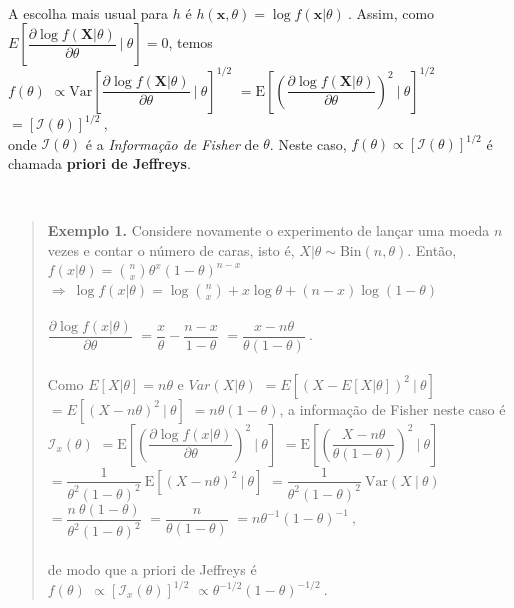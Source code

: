 \documentclass[
]{book}
\begin{document}
\(~\)

A escolha mais usual para \(h\) é \(h(\boldsymbol{x},\theta)=\log f(\boldsymbol{x}|\theta)~.\) Assim, como \(E\left[\dfrac{\partial \log f(\boldsymbol{X}|\theta)}{\partial\theta}~\bigg|~\theta\right]=0\), temos\\
\(f(\theta)\)
\(\propto\text{Var}\left[\dfrac{\partial \log f(\boldsymbol{X}|\theta)}{\partial\theta}~\bigg|~\theta\right]^{1/2}\)
\(=\text{E}\left[\left(\dfrac{\partial \log f(\boldsymbol{X}|\theta)}{\partial\theta}\right)^2~\bigg|~\theta\right]^{1/2}\)
\(=\left[\mathcal{I}(\theta)\right]^{1/2}~,\)\\
onde \(\mathcal{I}(\theta)\) é a \emph{Informação de Fisher} de \(\theta\). Neste caso, \(f(\theta)\propto\left[\mathcal{I}(\theta)\right]^{1/2}\) é chamada \textbf{priori de Jeffreys}.

\(~\)

\begin{quote}
\textbf{Exemplo 1.} Considere novamente o experimento de lançar uma moeda \(n\) vezes e contar o número de caras, isto é, \(X|\theta \sim \text{Bin}(n,\theta)\). Então,\\
\(f(x|\theta)=\displaystyle\binom{n}{x}\theta^x(1-\theta)^{n-x}\)
\(\Longrightarrow~ \log f(x|\theta)=\log\binom{n}{x}+x\log\theta+(n-x)\log(1-\theta)\)\\
\(~\)\\
\(\dfrac{\partial\log f(x|\theta)}{\partial\theta}\)
\(=\dfrac{x}{\theta}-\dfrac{n-x}{1-\theta}\)
\(=\dfrac{x-n\theta}{\theta(1-\theta)}~.\)\\
\(~\)\\
Como \(E\left[X|\theta\right]=n\theta\) e \(Var(X|\theta)\) \(=E\left[\left(X-E\left[X|\theta\right]\right)^2~\Big|~\theta\right]\) \(=E\left[\left(X-n\theta\right)^2~\Big|~\theta\right]\) \(=n\theta(1-\theta)\), a informação de Fisher neste caso é\\
\(\mathcal{I}_x(\theta)\) \(=\text{E}\left[\left(\dfrac{\partial\log f(x|\theta)}{\partial\theta}\right)^2~\bigg|~\theta\right]\) \(=\text{E}\left[\left(\dfrac{X-n\theta}{\theta(1-\theta)}\right)^2~\bigg|~\theta\right]\)
\(=\dfrac{1}{\theta^2(1-\theta)^2}~\text{E}\left[\left(X-n\theta\right)^2~|~\theta\right]\)
\(=\dfrac{1}{\theta^2(1-\theta)^2}~\text{Var}\left(X~|~\theta\right)\)
\(=\dfrac{n~\theta(1-\theta)}{\theta^2(1-\theta)^2}\)
\(=\dfrac{n}{\theta(1-\theta)}\) \(=n\theta^{-1}(1-\theta)^{-1}~,\)\\
\(~\)\\
de modo que a priori de Jeffreys é\\
\(f(\theta)\) \(\propto\left[\mathcal{I}_x(\theta)\right]^{1/2}\)
\(\propto\theta^{-1/2}(1-\theta)^{-1/2}~.\)
\end{quote}
\end{document}
